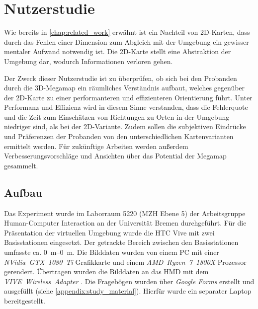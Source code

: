 \chapter{Nutzerstudie}
\label{chap:evaluation}
Wie bereits in \autoref{chap:related_work} erwähnt ist ein Nachteil von 2D-Karten, dass durch das Fehlen einer Dimension zum Abgleich mit der Umgebung ein gewisser mentaler Aufwand notwendig ist.
Die 2D-Karte stellt eine Abstraktion der Umgebung dar, wodurch Informationen verloren gehen.

Der Zweck dieser Nutzerstudie ist zu überprüfen, ob sich bei den Probanden durch die 3D-Megamap ein räumliches Verständnis aufbaut, welches gegenüber der 2D-Karte zu einer performanteren und effizienteren Orientierung führt.
Unter Performanz und Effizienz wird in diesem Sinne verstanden, dass die Fehlerquote und die Zeit zum Einschätzen von Richtungen zu Orten in der Umgebung niedriger sind, als bei der 2D-Variante.
Zudem sollen die subjektiven Eindrücke und Präferenzen der Probanden von den unterschiedlichen Kartenvarianten ermittelt werden.
Für zukünftige Arbeiten werden außerdem Verbesserungsvorschläge und Ansichten über das Potential der Megamap gesammelt.

\section{Aufbau}
Das Experiment wurde im Laborraum 5220 (MZH Ebene 5) der Arbeitsgruppe Human-Computer Interaction an der Universität Bremen durchgeführt.
Für die Präsentation der virtuellen Umgebung wurde die HTC Vive mit zwei Basisstationen eingesetzt.
Der getrackte Bereich zwischen den Basisstationen umfasste ca. \SIrange{0}{0}{\metre}.
Die Bilddaten wurden von einem PC mit einer \emph{NVidia~GTX~1080~Ti} Grafikkarte und einem \emph{AMD~Ryzen~7~1800X} Prozessor gerendert.
Übertragen wurden die Bilddaten an das HMD mit dem \emph{VIVE~Wireless~Adapter} \parencite{HTCCorporation2018b}.
Die Fragebögen wurden über \emph{Google Forms} erstellt und ausgefüllt (siehe \autoref{appendix:study_material}).
Hierfür wurde ein separater Laptop bereitgestellt.

